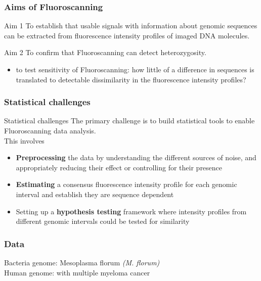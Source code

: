 \documentclass[10pt,dvipsnames,table]{beamer}
\begin{document}
\begin{frame}
\frametitle{Aims of Fluoroscanning}
\begin{block}{Aim 1}
To establish that usable signals with information about genomic sequences can be extracted from fluorescence intensity profiles of imaged DNA molecules.
\end{block}
\vspace{1cm}
\begin{block}{Aim 2}
To confirm that Fluoroscanning can detect heterozygosity. 
\begin{itemize}
\footnotesize
\item to test sensitivity of Fluoroscanning: how little of a difference in sequences is translated to detectable dissimilarity in the fluorescence intensity profiles?
\end{itemize}
\end{block}
\end{frame}

\begin{frame}
\frametitle{Statistical challenges}
\begin{block}{Statistical challenges}
{\Large{The primary challenge is to build statistical tools to enable Fluoroscanning data analysis.}} \\This involves
\begin{itemize}
\item {\bf{Preprocessing}} the data by understanding the different sources of noise, and appropriately reducing their effect or controlling for their presence
\vspace{0.5cm}
\item {\bf{Estimating}} a consensus fluorescence intensity profile for each genomic interval and establish they are sequence dependent
\vspace{0.5cm}
\item Setting up a {\bf{hypothesis testing}} framework where intensity profiles from different genomic intervals could be tested for similarity
\end{itemize}
\end{block}
\end{frame}

\begin{frame}
\frametitle{Data}
\Large
Bacteria genome: Mesoplasma florum {\emph{(M. florum)}} \\
\vspace{2cm}
Human genome: with multiple myeloma cancer
\end{frame}
\end{document}
